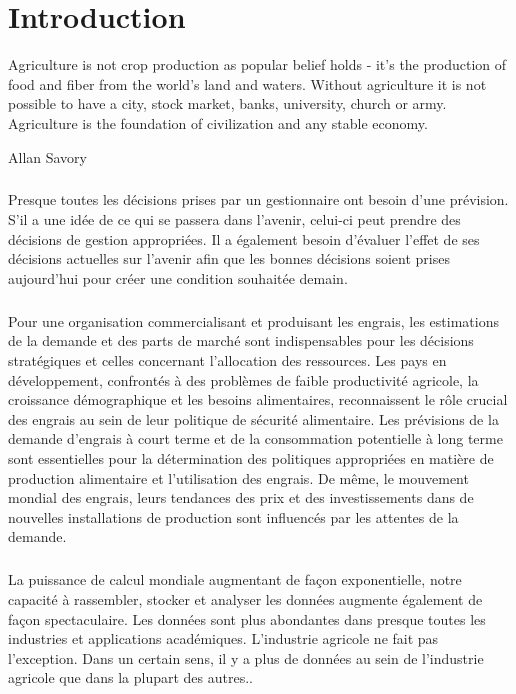 \chapter*{Introduction}
\epigraph{Agriculture is not crop production as popular belief holds - it's the production of food and fiber from the world's land and waters. Without agriculture it is not possible to have a city, stock market, banks, university, church or army. Agriculture is the foundation of civilization and any stable economy.}{Allan Savory}

\paragraph{}
Presque toutes les décisions prises par un gestionnaire ont besoin d'une prévision. S'il a une idée de ce qui se passera dans l'avenir, celui-ci peut prendre des décisions de gestion appropriées. Il a également besoin d'évaluer l'effet de ses décisions actuelles sur l'avenir afin que les bonnes décisions soient prises aujourd'hui pour créer une condition souhaitée demain.
\paragraph{}
Pour une organisation commercialisant et produisant les engrais, les estimations de la demande et des parts de marché sont indispensables pour les décisions stratégiques et celles concernant l'allocation des ressources. Les pays en développement, confrontés à des problèmes de faible productivité agricole, la croissance démographique et les besoins alimentaires, reconnaissent le rôle crucial des engrais au sein de leur politique de sécurité alimentaire. Les prévisions de la demande d'engrais à court terme et de la consommation potentielle à long terme sont essentielles pour la détermination des politiques appropriées en matière de production alimentaire et l'utilisation des engrais. De même, le mouvement mondial des engrais, leurs tendances des prix et des investissements dans de nouvelles installations de production sont influencés par les attentes de la demande.
\paragraph{}
La puissance de calcul mondiale augmentant de façon exponentielle, notre capacité à rassembler, stocker et analyser les données augmente également de façon spectaculaire. Les données sont plus abondantes dans presque toutes les industries et applications académiques. L'industrie agricole ne fait pas l'exception. Dans un certain sens, il y a plus de données au sein de l'industrie agricole que dans la plupart des autres.\cite{MIT-BIGDATA}.

